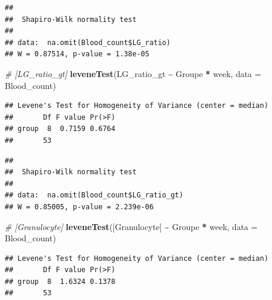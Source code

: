 \documentclass[
]{article}
\newenvironment{Shaded}{\begin{snugshade}}{\end{snugshade}}
\newcommand{\AttributeTok}[1]{\textcolor[rgb]{0.13,0.29,0.53}{#1}}
\newcommand{\CommentTok}[1]{\textcolor[rgb]{0.56,0.35,0.01}{\textit{#1}}}
\newcommand{\FunctionTok}[1]{\textcolor[rgb]{0.13,0.29,0.53}{\textbf{#1}}}
\newcommand{\NormalTok}[1]{#1}
\newcommand{\SpecialCharTok}[1]{\textcolor[rgb]{0.81,0.36,0.00}{\textbf{#1}}}
\newcommand{\StringTok}[1]{\textcolor[rgb]{0.31,0.60,0.02}{#1}}
\begin{document}
\begin{verbatim}
## 
##  Shapiro-Wilk normality test
## 
## data:  na.omit(Blood_count$LG_ratio)
## W = 0.87514, p-value = 1.38e-05
\end{verbatim}

\begin{Shaded}
\begin{Highlighting}[]
\CommentTok{\# [LG\_ratio\_gt]}
\FunctionTok{leveneTest}\NormalTok{(}\StringTok{\textasciigrave{}}\AttributeTok{LG\_ratio\_gt}\StringTok{\textasciigrave{}} \SpecialCharTok{\textasciitilde{}}\NormalTok{ Groupe }\SpecialCharTok{*}\NormalTok{ week, }\AttributeTok{data =}\NormalTok{ Blood\_count)}
\end{Highlighting}
\end{Shaded}

\begin{verbatim}
## Levene's Test for Homogeneity of Variance (center = median)
##       Df F value Pr(>F)
## group  8  0.7159 0.6764
##       53
\end{verbatim}

\begin{Shaded}
\end{Shaded}

\begin{verbatim}
## 
##  Shapiro-Wilk normality test
## 
## data:  na.omit(Blood_count$LG_ratio_gt)
## W = 0.85005, p-value = 2.239e-06
\end{verbatim}

\begin{Shaded}
\begin{Highlighting}[]
\CommentTok{\# [Granulocyte]}
\FunctionTok{leveneTest}\NormalTok{(}\StringTok{\textasciigrave{}}\AttributeTok{[Granulocyte]}\StringTok{\textasciigrave{}} \SpecialCharTok{\textasciitilde{}}\NormalTok{ Groupe }\SpecialCharTok{*}\NormalTok{ week, }\AttributeTok{data =}\NormalTok{ Blood\_count)}
\end{Highlighting}
\end{Shaded}

\begin{verbatim}
## Levene's Test for Homogeneity of Variance (center = median)
##       Df F value Pr(>F)
## group  8  1.6324 0.1378
##       53
\end{verbatim}
\end{document}
